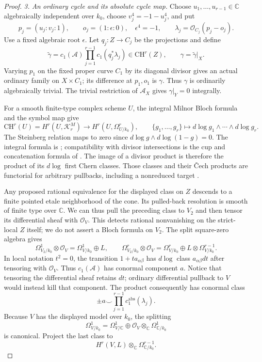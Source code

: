 \begin{proof}
\emph{3. An ordinary cycle and its absolute cycle map.}
Choose $u_1,\ldots,u_{r-1}\in\mathbb C$ algebraically
independent over $k_0$, choose $v_j^4=-1-u_j^4$, and put
\[
 p_j=(u_j:v_j:1),\qquad
 o_j=(1:\epsilon:0),\quad\epsilon^4=-1,\qquad
 \lambda_j=\mathcal O_{C_j}(p_j-o_j).
\]
Use a fixed algebraic root $\epsilon$. Let $q_j:Z\to C_j$
be the projections and define
\[
 \widetilde\gamma
      =c_1(\mathcal A)\prod_{j=1}^{r-1}c_1(q_j^*\lambda_j)
             \in\mathrm{CH}^r(Z),\qquad
 \gamma=\widetilde\gamma|_X.
\]
Varying $p_1$ on the fixed proper curve $C_1$ by its
diagonal divisor gives an actual ordinary family on
$X\times C_1$; its difference at $p_1,o_1$ is $\gamma$.
Thus $\gamma$ is ordinarily algebraically trivial.
The trivial restriction of $\mathcal A_X$ gives
$\gamma|_Y=0$ integrally.

For a smooth finite-type complex scheme $U$, the integral
Milnor Bloch formula and the symbol map give
\[
 \mathrm{CH}^r(U)=H^r(U,\mathcal K^M_r)
       \longrightarrow H^r(U,\Omega^r_{U/k_0}),\qquad
 \{g_1,\ldots,g_r\}\longmapsto
                   d\log g_1\wedge\cdots\wedge d\log g_r.
\]
The Steinberg relation maps to zero since
$d\log g\wedge d\log(1-g)=0$. The integral formula is
\citet[Theorems 7.1 and 7.5, author pp.~20--22]{cyKerz2009Milnor};
compatibility with divisor intersections is the cup and
concatenation formula of
\citet[Section 3, pp.~557--558]{cyBraunling2013}.
The image of a divisor product is therefore the product
of its $d\log$ first Chern classes. Those classes and
their \v Cech products are functorial for arbitrary
pullbacks, including a nonreduced target
\citep[Section 50.9 and Lemma 50.9.1, Tag 0FMD]{cyStacksHodgeChern}.

Any proposed rational equivalence for the displayed
class on $Z$ descends to a finite pointed etale
neighborhood of the cone. Its pulled-back resolution
is smooth of finite type over $\mathbb C$. We can thus
pull the preceding class to $V_2$ and then tensor its
differential sheaf with $\mathcal O_V$. This detects
rational nonvanishing on the strict-local $Z$ itself;
we do not assert a Bloch formula on $V_2$.
The split square-zero algebra gives
\[
 \Omega^1_{V_2/k_0}\otimes\mathcal O_V
       =\Omega^1_{V/k_0}\oplus L,
 \qquad
 \Omega^r_{V_2/k_0}\otimes\mathcal O_V
       =\Omega^r_{V/k_0}\oplus
                         L\otimes\Omega^{r-1}_{V/k_0}.
\]
In local notation $t^2=0$, the transition $1+t a_{\alpha\beta}$
has $d\log$ class $a_{\alpha\beta}dt$ after tensoring
with $\mathcal O_V$. Thus $c_1(\mathcal A)$ has
conormal component $a$. Notice that tensoring the
differential sheaf retains $dt$; ordinary differential
pullback to $V$ would instead kill that component.
The product consequently has conormal class
\[
                   \pm a\smile\prod_{j=1}^{r-1}
                                  c_1^{\mathrm{abs}}(\lambda_j).
\]
Because $V$ has the displayed model over $k_0$, the splitting
\[
 \Omega^1_{V/k_0}
   =\Omega^1_{V/\mathbb C}
          \oplus\mathcal O_V\otimes_{\mathbb C}
                         \Omega^1_{\mathbb C/k_0}
\]
is canonical. Project the last class to
\[
             H^r(V,L)\otimes_{\mathbb C}
                             \Omega^{r-1}_{\mathbb C/k_0}.
\]


\end{proof}
